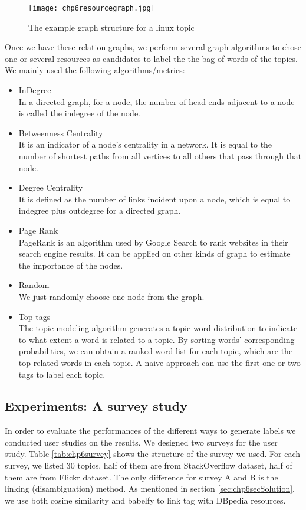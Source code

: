 \begin{figure}[htp]
\centering
\texttt{[image: chp6resourcegraph.jpg]}  
\caption{The example graph structure for a linux topic}
\label{fig:chp6resourcegraph} 
\end{figure}

Once we have these relation graphs, we perform several graph algorithms to chose one or several resources as candidates to label the the bag of words of the topics. We mainly used the following algorithms/metrics:
\begin{itemize}
    \item {InDegree} \\
    In a directed graph, for a node, the number of head ends adjacent to a node is called the indegree of the node. 
    \item {Betweenness Centrality } \\
    It is an indicator of a node's centrality in a network. It is equal to the number of shortest paths from all vertices to all others that pass through that node.
    \item {Degree Centrality} \\
    It is defined as the number of links incident upon a node, which is equal to indegree plus outdegree for a directed graph.
    \item {Page Rank\cite{chp6page1999pagerank}}\\
    PageRank is an algorithm used by Google Search to rank websites in their search engine results. It can be applied on other kinds of graph to estimate the importance of the nodes.
    \item {Random} \\
    We just randomly choose one node from the graph.
    \item {Top tags} \\
    The topic modeling algorithm generates a topic-word distribution to indicate to what extent a word is related to a topic. By sorting words' corresponding probabilities, we can obtain a ranked word list for each topic, which are the top related words in each topic. A naive approach can use the first one or two tags to label each topic. 

\end{itemize}

\subsection{Experiments: A survey study}
In order to evaluate the performances of the different ways to generate labels we conducted user studies on the results. We designed two surveys for the user study. Table \ref{tab:chp6survey} shows the structure of the survey we used. For each survey, we listed 30 topics, half of them are from StackOverflow dataset, half of them are from Flickr dataset. The only difference for survey A and B is the linking (disambiguation) method. As mentioned in section \ref{sec:chp6secSolution}, we use both cosine similarity and babelfy to link tag with DBpedia resources. 

